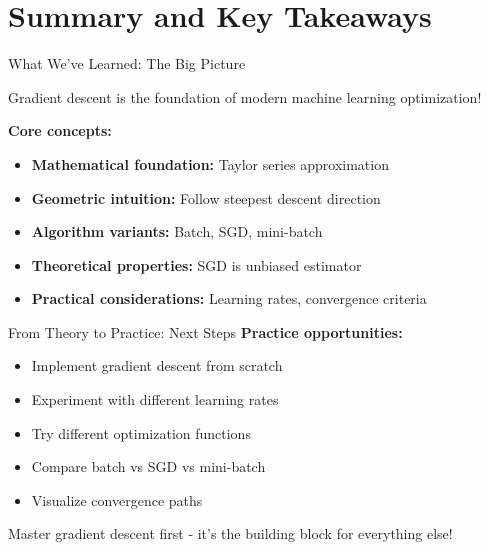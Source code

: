 \documentclass[usenames,dvipsnames]{beamer}
\begin{document}
  \section{Summary and Key Takeaways}

  \begin{frame}{What We've Learned: The Big Picture}
    \begin{keypointsbox}
    Gradient descent is the foundation of modern machine learning optimization!
    \end{keypointsbox}
    
    \pause
    \textbf{Core concepts:}
    \begin{itemize}[<+->]
        \item \textbf{Mathematical foundation:} Taylor series approximation
        \item \textbf{Geometric intuition:} Follow steepest descent direction
        \item \textbf{Algorithm variants:} Batch, SGD, mini-batch
        \item \textbf{Theoretical properties:} SGD is unbiased estimator
        \item \textbf{Practical considerations:} Learning rates, convergence criteria
    \end{itemize}
  \end{frame}

  \begin{frame}{From Theory to Practice: Next Steps}
    \textbf{Practice opportunities:}
    \begin{itemize}[<+->]
        \item Implement gradient descent from scratch
        \item Experiment with different learning rates
        \item Try different optimization functions
        \item Compare batch vs SGD vs mini-batch
        \item Visualize convergence paths
    \end{itemize}
    
    \pause
    \begin{keypointsbox}
    Master gradient descent first - it's the building block for everything else!
    \end{keypointsbox}
  \end{frame}
\end{document}
